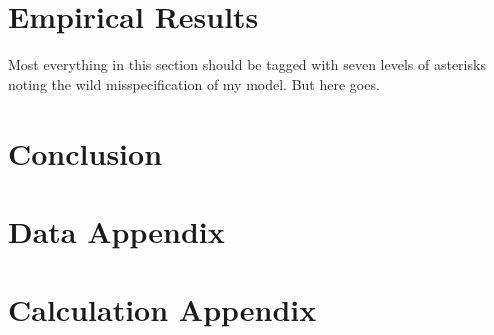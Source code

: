 \documentclass[11pt]{article}
\begin{document}
\section{Empirical Results} %
\label{sec:empirical_results}
  Most everything in this section should be tagged with seven levels of asterisks noting the wild misspecification of my model.  But here goes.

  
\section{Conclusion}
\label{sec:conclusion}

\section{Data Appendix}
\label{sec:data_appendix}

\section{Calculation Appendix}
\label{sec:calculation_appendix}





\end{document}

